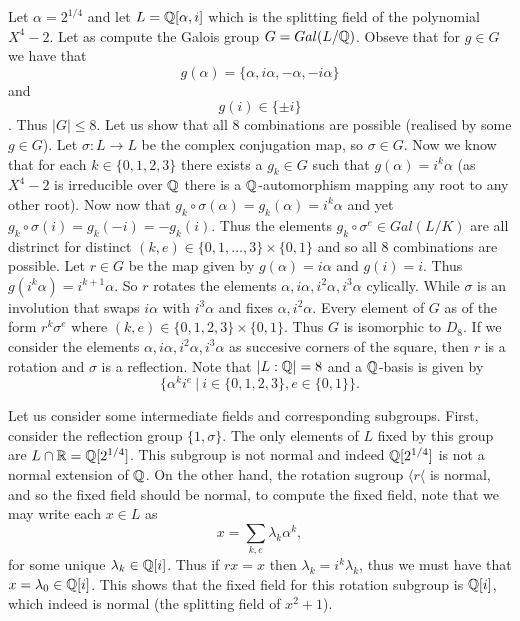 \documentclass[twoside, a4paper, 10pt]{amsart}
\begin{document}
\begin{eg} Let $\alpha = 2^{1/4}$ and let $L = \mathbb{Q}[\alpha, i]$ which is the splitting field of the polynomial $X^4 - 2$. Let as compute the Galois group $G=Gal(L/\mathbb{Q})$. Obseve that for $g \in G$ we have that $$g(\alpha) = \{\alpha, i \alpha, -\alpha, -i \alpha\}$$ and $$g(i) \in \{\pm i\}$$. Thus $|G| \leq 8$. Let us show that all $8$ combinations are possible (realised by some $g \in G$). Let $\sigma:L \to L$ be the complex conjugation map, so $\sigma \in G$. Now we know that for each $k \in \{0,1,2,3\}$ there exists a $g_k \in G$ such that $g(\alpha) = i^k \alpha$ (as $X^4-2$ is irreducible over $\mathbb{Q}$ there is a $\mathbb{Q}$-automorphism mapping any root to any other root). Now now that $g_k \circ \sigma(\alpha) = g_k(\alpha) = i^k \alpha$ and yet $g_k \circ \sigma (i) = g_k(-i) = -g_k(i)$. Thus the elements $g_k \circ \sigma^{e} \in Gal(L/K)$ are all distrinct for distinct $(k,e) \in \{0,1, \ldots, 3\} \times \{0,1\}$ and so all $8$ combinations are possible. Let $ r \in G$ be the map given by $g(\alpha) = i\alpha$ and $g(i)=i$. Thus $g(i^k \alpha) = i^{k+1}\alpha$. So $r$ rotates the elements $\alpha, i\alpha, i^2\alpha, i^3\alpha$ cylically. While $\sigma$ is an involution that swaps $i\alpha$ with $i^3\alpha$ and fixes $\alpha, i^2\alpha$. Every element of $G$ as of the form $r^k \sigma^e$ where $(k,e) \in \{0,1,2,3\} \times \{0,1\}$. Thus $G$ is isomorphic to $D_8$. If we consider the elements $\alpha, i\alpha, i^2\alpha, i^3\alpha$ as succesive corners of the square, then $r$ is a rotation and $\sigma$ is a reflection. Note that $|L:\mathbb{Q}| = 8$ and a $\mathbb{Q}$-basis is given by $$\{\alpha^k i ^e ~|~ i \in \{0,1,2,3\}, e \in \{0,1\} \}.$$ 

Let us consider some intermediate fields and corresponding subgroups. First, consider the reflection group $\{1, \sigma\}$. The only elements of $L$ fixed by this group are $L \cap \mathbb{R} = \mathbb{Q}[2^{1/4}]$. This subgroup is not normal and indeed $\mathbb{Q}[2^{1/4}]$ is not a normal extension of $\mathbb{Q}$. On the other hand, the rotation sugroup $\langle r \langle$ is normal, and so the fixed field should be normal, to compute the fixed field, note that we may write each $x \in L$ as $$x = \sum_{k,e} \lambda_k \alpha^k,$$ for some unique $\lambda_k \in \mathbb{Q}[i]$. Thus if $rx=x$ then $\lambda_k = i^k \lambda_k$, thus we must have that $x = \lambda_0 \in \mathbb{Q}[i]$. This shows that the fixed field for this rotation subgroup is $\mathbb{Q}[i]$, which indeed is normal (the splitting field of $x^2+1$). \end{eg}
\end{document}
